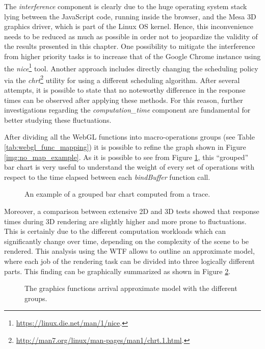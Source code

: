 The \emph{interference} component is clearly due to the huge operating system
stack lying between the JavaScript code, running inside the
browser, and the Mesa 3D graphics driver, which is part of the Linux OS kernel.
Hence, this inconvenience needs to be reduced as much as possible in order not
to jeopardize the validity of the results presented in this chapter.
One possibility to mitigate
the interference from higher priority tasks is to increase that of
the Google Chrome instance using the \emph{nice}\footnote{\url{https://linux.die.net/man/1/nice}.}
tool. Another approach includes directly changing the scheduling policy via the
\emph{chrt}\footnote{\url{http://man7.org/linux/man-pages/man1/chrt.1.html}.}
utility for using a different scheduling algorithm. After several attempts,
it is possible to state that no
noteworthy difference in the response times can be observed after applying these
methods. For this reason, further investigations regarding the \emph{computation\_time}
component are fundamental for better studying these fluctuations.

After dividing all the WebGL functions into macro-operations groups
(see Table \ref{tab:webgl_func_mapping}) it is possible to refine the graph shown
in Figure \ref{img:no_map_example}. As it is possible to see from Figure
\ref{img:no_map_groups}, this ``grouped'' bar chart is very useful to understand
the weight of every set of operations with respect to the time elapsed between
each \emph{bindBuffer} function call.
\begin{figure}[!htb]
    \caption{An example of a grouped bar chart computed from a trace.}
    \label{img:no_map_groups}
\end{figure}

Moreover, a comparison between extensive 2D and 3D tests showed that response times
during 3D rendering are slightly higher and more prone to fluctuations. This is
certainly due to the different computation workloads which can significantly change
over time, depending on the complexity of the scene to be rendered.
This analysis using the WTF allows to outline an approximate model, where
each job of the rendering task can be divided into three logically different
parts. This finding can be graphically summarized as shown in Figure \ref{img:call_arrival}.
\begin{figure}[!htb]
    \caption{The graphics functions arrival approximate model with the different groups.}
    \label{img:call_arrival}
\end{figure}

